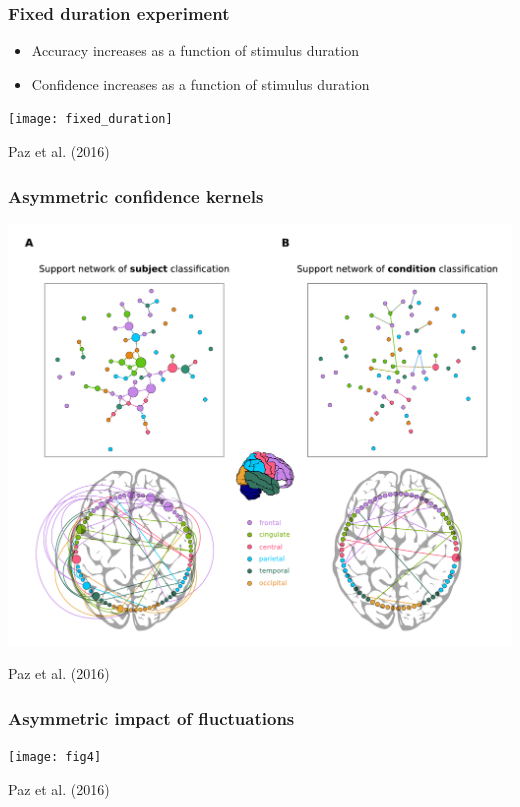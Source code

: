 \documentclass[final]{beamer}
\begin{document}
\begin{frame}
\frametitle{Fixed duration experiment}
\begin{itemize}
		\pause
	\item Accuracy increases as a function of stimulus duration
		\pause
	\item Confidence increases as a function of stimulus duration 
\end{itemize}
\pause
\begin{center}
\texttt{[image: fixed\_duration]}
\end{center}
\vspace{1cm}
\tiny{Paz et al. (2016)}
\end{frame}

\begin{frame}
\frametitle{Asymmetric confidence kernels}
\begin{center}
\includegraphics[width=0.6\columnwidth]{fig5}
\end{center}
\vspace{1cm}
\tiny{Paz et al. (2016)}
\end{frame}

\begin{frame}
\frametitle{Asymmetric impact of fluctuations}
\begin{center}
\texttt{[image: fig4]}
\end{center}
\vspace{1cm}
\tiny{Paz et al. (2016)}
\end{frame}
\end{document}

